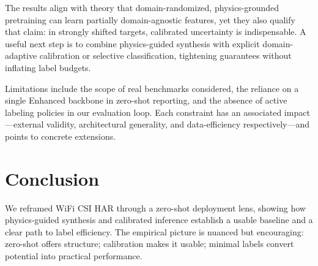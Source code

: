 \documentclass[journal]{IEEEtran}
\begin{document}
The results align with theory that domain-randomized, physics-grounded pretraining can learn partially domain-agnostic features, yet they also qualify that claim: in strongly shifted targets, calibrated uncertainty is indispensable. A useful next step is to combine physics-guided synthesis with explicit domain-adaptive calibration or selective classification, tightening guarantees without inflating label budgets.

Limitations include the scope of real benchmarks considered, the reliance on a single Enhanced backbone in zero-shot reporting, and the absence of active labeling policies in our evaluation loop. Each constraint has an associated impact—external validity, architectural generality, and data-efficiency respectively—and points to concrete extensions.

\section{Conclusion}
We reframed WiFi CSI HAR through a zero-shot deployment lens, showing how physics-guided synthesis and calibrated inference establish a usable baseline and a clear path to label efficiency. The empirical picture is nuanced but encouraging: zero-shot offers structure; calibration makes it usable; minimal labels convert potential into practical performance.



\end{document}
